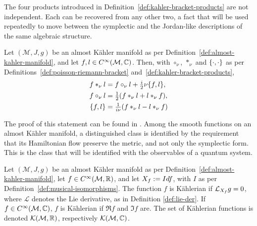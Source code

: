 \noindent The four products introduced in
Definition~\ref{def:kahler-bracket-products} are not independent. Each
can be recovered from any other two, a fact that will be used repeatedly to move between the symplectic and the Jordan-like descriptions of the same algebraic structure.

\begin{proposition}
	\label{prop:kahler-products-identities}
	Let $(\mathcal{M},J,g)$ be an almost Kähler manifold as per
	Definition~\ref{def:almost-kahler-manifold}, and let $f,l\in
	C^\infty(\mathcal{M},\C)$. Then, with $\circ_\nu$, $*_{\nu}$ and
	$\{\cdot,\cdot\}$ as per Definitions~\ref{def:poisson-riemann-bracket}
	and~\ref{def:kahler-bracket-products},
	\begin{align}
		f*_{\nu} l&=f\circ_\nu l+\tfrac{i}{2}\nu\{f,l\},\\
		f\circ_\nu l&=\tfrac12(f*_{\nu} l+l*_{\nu} f),\\
		\{f,l\}&=\tfrac{1}{i\nu}(f*_{\nu} l-l*_{\nu} f)
	\end{align}
\end{proposition}

\noindent The proof of this statement can be found in \cite[Equations~(2.10)--(2.12)]{cirelliQuantumMechanicsInfinitedimensional1990}. Among the smooth functions on an almost Kähler manifold, a distinguished class is identified by the requirement that its Hamiltonian flow preserve the metric, and not only the symplectic form. This is the class that will be identified with the observables of a quantum system.

\begin{definition}
	\label{def:kahlerian-function}
	Let $(\mathcal{M},J,g)$ be an almost Kähler manifold as per
	Definition~\ref{def:almost-kahler-manifold}, let $f\in
	C^\infty(\mathcal{M},\R)$, and let $X_{f}:=Idf$, with $I$ as per
	Definition~\ref{def:musical-isomorphisms}. The function $f$ is
	Kählerian if $\mathcal{L}_{\Ham{f}}g=0$, where $\mathcal{L}$ denotes the Lie derivative, as in Definition \ref{def:lie-der}.
	If $f\in C^\infty(\mathcal{M},\C)$, $f$ is Kählerian if $\Re f$ and $\Im f$ are.
	The set of Kählerian functions is denoted $\mathcal{K}(\mathcal{M},\R)$, respectively
	$\mathcal{K}(\mathcal{M},\C)$.
\end{definition}

